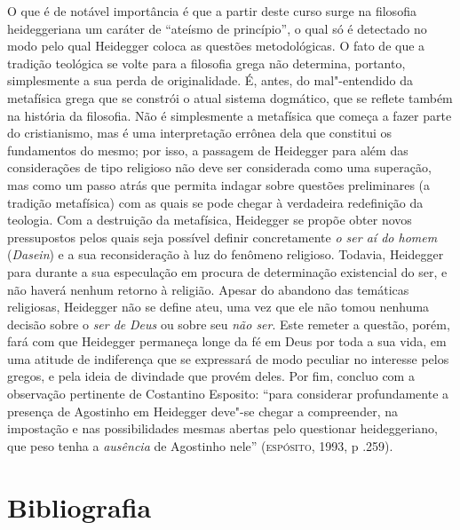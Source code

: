 O que é de notável importância é que a partir deste curso surge
na filosofia heideggeriana um caráter de “ateísmo de princípio”,
o qual só é detectado no modo pelo qual Heidegger coloca as
questões metodológicas. O fato de que a tradição teológica se
volte para a filosofia grega não determina, portanto,
simplesmente a sua perda de originalidade. É, antes, do
mal"-entendido da metafísica grega que se constrói o atual
sistema dogmático, que se reflete também na história da
filosofia. Não é simplesmente a metafísica que começa a fazer
parte do cristianismo, mas é uma interpretação errônea dela que
constitui os fundamentos do mesmo; por isso, a passagem de
Heidegger para além das considerações de tipo religioso não deve
ser considerada como uma superação, mas como um passo atrás que
permita indagar sobre questões preliminares (a tradição
metafísica) com as quais se pode chegar à verdadeira redefinição
da teologia. Com a destruição da metafísica, Heidegger se propõe
obter novos pressupostos pelos quais seja possível definir
concretamente \emph{o ser aí do homem} (\emph{Dasein}) e a
sua reconsideração à luz do fenômeno religioso. Todavia,
Heidegger para durante a sua especulação em procura de
determinação existencial do ser, e não haverá nenhum retorno à
religião. Apesar do abandono das temáticas religiosas, Heidegger
não se define ateu, uma vez que ele não tomou nenhuma decisão
sobre o \emph{ser de} \emph{Deus} ou sobre seu
\emph{não ser}. Este remeter a questão, porém, fará com que
Heidegger permaneça longe da fé em Deus por toda a sua vida, em
uma atitude de indiferença que se expressará de modo peculiar no
interesse pelos gregos, e pela ideia de divindade que provém
deles. Por fim, concluo com a observação pertinente de
Costantino Esposito: “para considerar profundamente a presença
de Agostinho em Heidegger deve"-se chegar a compreender, na
impostação e nas possibilidades mesmas abertas pelo questionar
heideggeriano, que peso tenha a \emph{ausência} de Agostinho
nele” (\textsc{espósito}, 1993, p .259).  

\section{Bibliografia}

